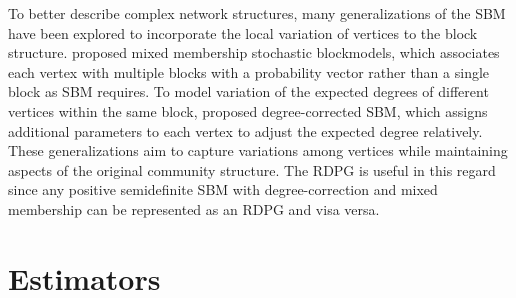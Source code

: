 \documentclass[journal,twoside,web]{ieeecolor}
\newtheorem{remark}[fact]{Remark}
\begin{document}

To better describe complex network structures, many
generalizations of the SBM have been explored to incorporate the local variation of vertices to the block structure. 
\cite{airoldi2008mixed} proposed mixed membership stochastic blockmodels, which associates each vertex with multiple blocks with a probability vector rather than a single block as SBM requires.
To model variation of the expected degrees of different vertices within the same block, \cite{karrer2011stochastic} proposed degree-corrected SBM, which assigns additional parameters to each vertex to adjust the expected degree relatively.
These generalizations aim to capture variations among vertices while maintaining aspects of the original community structure.
The RDPG is useful in this regard since any positive semidefinite SBM with degree-correction and mixed membership can be represented as an RDPG and visa versa.


\section{Estimators}
\label{sec:estimator}

\end{document}
